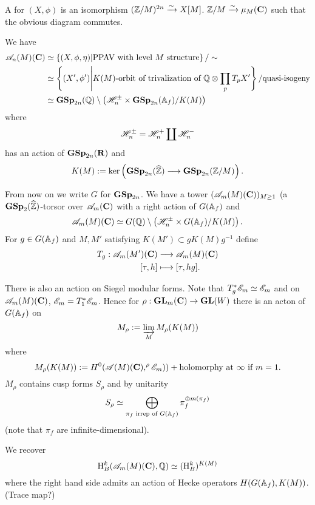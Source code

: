 \begin{definition}
	A  for $(X,\phi)$ is an isomorphism $(\mathbb Z /M)^{2n}\xrightarrow{\sim} X[M]$. $\mathbb Z /M\xrightarrow{\sim} \mu_M(\mathbf{C})$ such that the obvious diagram commutes.
\end{definition}
We have
\begin{align*}
	\mathscr{A}_n(M)(\mathbf{C}) &\simeq \left\{ (X,\phi,\eta) \middle| \text{PPAV with level }M\text{ structure} \right\} / \sim \\
			 &\simeq \left\{ (X',\phi') \middle| K(M)\text{-orbit of trivalization of }\mathbb Q\otimes \prod_p T_pX' \right\} / \text{quasi-isogeny} \\
			 &\simeq \mathbf{GSp}_{2n}(\mathbb Q) \setminus \left( \mathscr H_n^{\pm}\times \mathbf{GSp}_{2n}(\mathbb{A}_f) /K(M) \right) 
\end{align*}
where
\[
	\mathscr H_n^{\pm} = \mathscr H_n^{+} \coprod \mathscr H_n^{-}
\] 
has an action of $\mathbf{GSp}_{2n}(\mathbf{R})$ and
\[
	K(M) \defeq \ker \left( \GSp_{2n}(\wh{\Z}) \to \GSp_{2n}(\Z /M) \right) .
\] 

From now on we write $G$ for $\mathbf{GSp}_{2n}$.
We have a tower $(\mathscr{A}_m(M)(\mathbf{C}))_{M\ge 1}$ (a $\mathbf{GSp}_2(\widehat{\mathbb Z})$-torsor over $\mathscr{A}_m(\mathbf{C})$ with a right action of $G(\mathbb{A}_f)$ and
\[
	\mathscr{A}_m(M)(\mathbf{C}) \simeq G(\mathbb Q) \setminus \left( \mathscr H_n^{\pm} \times G(\mathbb{A}_f) /K(M) \right) .
\] 
For $g\in G(\mathbb{A}_f)$ and $M,M'$ satisfying $K(M')\subset gK(M)g^{-1}$ define
\begin{align*}
	T_g: \mathscr{A}_m(M')(\mathbf{C}) &\longrightarrow \mathscr{A}_m(M)(\mathbf{C}) \\
	[\tau, h] &\longmapsto [\tau, hg].
\end{align*}

There is also an action on Siegel modular forms. Note that $T_g^{*}\mathscr{E}_m\simeq \mathscr{E}_m$ and on $\mathscr{A}_m(M)(\mathbf{C})$, $\mathscr{E}_m=T_1^{*}\mathscr{E}_m$. Hence  for $\rho:\GL_m(\C)\to \GL(W)$ there is an acton of $G(\mathbb{A}_f)$ on 
\[
M_\rho := \varinjlim_M M_\rho(K(M))
\] 
where
\[
M_\rho(K(M)) := H^{0}(\mathscr{A}(M)(\mathbf{C}), ^{\rho}\mathscr{E}_m)) + \text{holomorphy at }\infty\text{ if }m=1.
\] 
$M_\rho$ contains cusp forms $S_\rho$ and by unitarity
\[
S_\rho \simeq \bigoplus_{\pi_f\text{ irrep of }G(\mathbb{A}_f)}\pi_f^{\oplus m(\pi_f)}
\] 
(note that $\pi_f$ are infinite-dimensional).

We recover 
\[
	\mathrm{H}_B^{k}(\mathscr{A}_m(M)(\mathbf{C}),\mathbb Q) \simeq (\mathrm{H}_B^{k})^{K(M)}
\] 
where the right hand side admits an action of Hecke operators $H(G(\mathbb{A}_f),K(M))$. (Trace map?)

